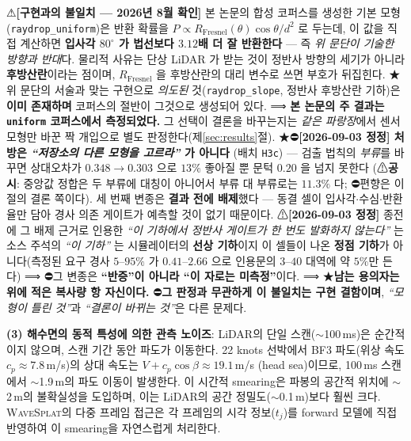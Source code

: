 \documentclass[11pt]{report}
\numberwithin{equation}{chapter}
\numberwithin{figure}{chapter}
\numberwithin{table}{chapter}
\newcommand{\WS}{\textsc{WaveSplat}}
\begin{document}
\label{sec:obs_model}
⚠\textbf{[구현과의 불일치 --- 2026년 8월 확인]} 본 논문의 합성 코퍼스를 생성한
기본 모형(\texttt{raydrop\_uniform})은 반환 확률을
$P \propto R_{\text{Fresnel}}(\theta)\cos\theta / d^2$ 로 두는데,
이 값을 직접 계산하면 \textbf{입사각 $80^\circ$ 가 법선보다 $3.12$배 더 잘 반환한다} ---
즉 \emph{위 문단이 기술한 방향과 반대}다. 물리적 사유는 단상 LiDAR 가 받는 것이
정반사 방향의 세기가 아니라 \textbf{후방산란}이라는 점이며, $R_{\text{Fresnel}}$ 을
후방산란의 대리 변수로 쓰면 부호가 뒤집힌다.
★위 문단의 서술과 맞는 구현으로 \emph{의도된} 것(\texttt{raydrop\_slope}, 정반사
후방산란 기하)은
\textbf{이미 존재하며} 코퍼스의 절반이 그것으로 생성되어 있다.
⟹ \textbf{본 논문의 주 결과는 \texttt{uniform} 코퍼스에서 측정되었다.}
그 선택이 결론을 바꾸는지는 \emph{같은 파랑장}에서 센서 모형만 바꾼 짝 개입으로
별도 판정한다(제\ref{sec:results}절).
★⛔\textbf{[2026-09-03 정정] 처방은 \emph{``저장소의 다른 모형을 고르라''} 가 아니다}
(배치 \texttt{H3c}) --- 검출 법칙의 \emph{부류}를 바꾸면 상대오차가
$0.348 \to 0.303$ 으로 $13\%$ 좋아질 뿐 문턱 $0.20$ 을 넘지 못한다
(⚠\textbf{공시}: 중앙값 정합은 두 부류에 대칭이 아니어서 부류 대 부류로는 $11.3\%$ 다;
⛔편향은 이 절의 결론 쪽이다). 세 번째 변종은 \textbf{결과 전에 배제}했다 --- 동결 셀이
입사각$\cdot$수심$\cdot$반환율만 담아 경사 의존 게이트가 예측할 것이 없기 때문이다.
⚠\textbf{[2026-09-03 정정]} 종전에 그 배제 근거로 인용한 \emph{``이 기하에서 정반사
게이트가 한 번도 발화하지 않는다''} 는 소스 주석의 \emph{``이 기하''} 는 시뮬레이터의
\textbf{선상 기하}이지 이 셀들이 나온 \textbf{정점 기하}가 아니다(측정된 요구 경사
$5$–$95\%$ 가 $0.41$–$2.66$ 으로 인용문의 $3$–$40$ 대역에 약 $5\%$만 든다)
⟹ ⛔그 변종은 \textbf{``반증''이 아니라 ``이 자로는 미측정''}이다.
⟹ ★\textbf{남는 용의자는 위에 적은 복사량 항 자신이다.}
⛔\textbf{그 판정과 무관하게 이 불일치는
구현 결함이며}, \emph{``모형이 틀린 것''}과 \emph{``결론이 바뀌는 것''}은 다른 문제다.

\textbf{(3) 해수면의 동적 특성에 의한 관측 노이즈}:
LiDAR의 단일 스캔($\sim$100\,ms)은 순간적이지 않으며,
스캔 기간 동안 파도가 이동한다.
22 knots 선박에서 BF3 파도(위상 속도 $c_p \approx 7.8$\,m/s)의
상대 속도는 $V + c_p \cos\beta \approx 19.1$\,m/s (head sea)이므로,
100\,ms 스캔에서 $\sim$1.9\,m의 파도 이동이 발생한다.
이 시간적 smearing은 파봉의 공간적 위치에 $\sim$2\,m의 불확실성을 도입하며,
이는 LiDAR의 공간 정밀도($\sim$0.1\,m)보다 훨씬 크다.
\WS{}의 다중 프레임 접근은 각 프레임의 시각 정보($t_j$)를
forward 모델에 직접 반영하여 이 smearing을 자연스럽게 처리한다.
\end{document}
